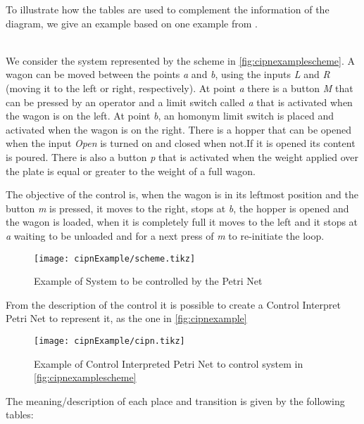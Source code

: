 To illustrate how the tables are used to complement the information of the diagram, we give an example based on one example from \cite{david1989grafcet}.
\begin{example} ~\\
  \label{ex:loadingOfAWagon}
We consider the system represented by the scheme in
\autoref{fig:cipnexamplescheme}. A wagon can be moved between the points \emph{a} and
\emph{b}, using the inputs \emph{L} and \emph{R} (moving it to the left or right,
respectively). At point \emph{a} there is a button \emph{M} that can be pressed by an
operator and a limit switch called \emph{a} that is activated when the wagon is on
the left. At point \emph{b}, an homonym limit switch is placed and activated when the
wagon is on the right. There is a hopper that can
be opened when the input \emph{Open} is turned on and closed when not.If it is opened
its content is poured. There is also a
button \emph{p} that is activated when the weight applied over the plate is equal or
greater to the weight of a full wagon. 

The objective of the control is, when the wagon is in its leftmost position and
the button \emph{m} is pressed, it moves to the right, stops at \emph{b}, the hopper is
opened and the wagon is loaded, when it is completely full it moves to the left
and it stops at \emph{a} waiting to be unloaded and for a next press of \emph{m} to re-initiate
the loop. 
\end{example}


\begin{figure}[H]
  \centering \texttt{[image: cipnExample/scheme.tikz]}
  \caption{Example of System to be controlled by the Petri Net}
  \label{fig:cipnexamplescheme}
\end{figure}
From the description of the control it is possible to create a Control Interpret
Petri Net to represent it, as the one in \autoref{fig:cipnexample}


\begin{figure}[H]
  \centering \texttt{[image: cipnExample/cipn.tikz]}
  \caption{Example of Control Interpreted Petri Net to control
    system in \autoref{fig:cipnexamplescheme}}
  \label{fig:cipnexample}
\end{figure}

The meaning\slash description of each place and transition is given by the
following tables:




